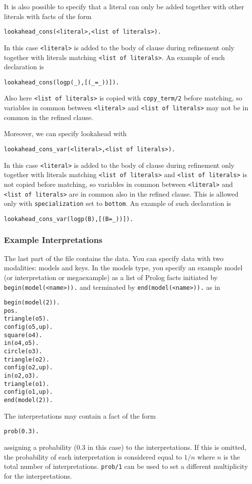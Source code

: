 It is also possible to specify that a literal can only be added together with 
other literals with facts of the form 
\begin{verbatim}
lookahead_cons(<literal>,<list of literals>).
\end{verbatim}
In this case \verb|<literal>| is added to the body of clause during refinement only together with
literals matching \verb|<list of literals>|.
An example of such declaration is
\begin{verbatim}
lookahead_cons(logp(_),[(_=_))]).
\end{verbatim}
Also here 
\verb|<list of literals>| is copied with \verb|copy_term/2| before matching, so
variables in common between \verb|<literal>| and \verb|<list of literals>|
may not be in common in the refined clause.

Moreover, we can specify lookahead with
\begin{verbatim}
lookahead_cons_var(<literal>,<list of literals>).
\end{verbatim}
In this case \verb|<literal>| is added to the body of clause during refinement only together with
literals matching \verb|<list of literals>| and \verb|<list of literals>| is not copied before matching, so
variables in common between \verb|<literal>| and \verb|<list of literals>|
are in common also in the refined clause. This is allowed only with
\verb|specialization| set to \verb|bottom|.
An example of such declaration is
\begin{verbatim}
lookahead_cons_var(logp(B),[(B=_))]).
\end{verbatim}

\subsubsection{Example Interpretations}
The last part of the file contains the data.
You can specify data with two modalities:
models and keys.
In the models type, you specify an example model (or interpretation or megaexample) as a list of Prolog facts initiated by 
\verb|begin(model(<name>)).| and terminated by \verb|end(model(<name>)).| as in
\begin{verbatim}
begin(model(2)).
pos.
triangle(o5).
config(o5,up).
square(o4).
in(o4,o5).
circle(o3).
triangle(o2).
config(o2,up).
in(o2,o3).
triangle(o1).
config(o1,up).
end(model(2)).
\end{verbatim}
The interpretations may contain a fact of the form
\begin{verbatim}
prob(0.3).
\end{verbatim}
assigning a probability (0.3 in this case) to the interpretations. If this is omitted, the probability of each interpretation is considered equal to $1/n$ where $n$ is the total number of interpretations. \verb|prob/1| can be used to set a different multiplicity for the interpretations.

